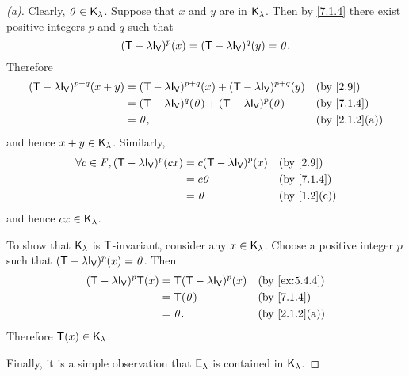 \begin{proof}[(a)]
  Clearly, \(\mathit{0} \in \mathsf{K}_{\lambda}\).
  Suppose that \(x\) and \(y\) are in \(\mathsf{K}_{\lambda}\).
  Then by \cref{7.1.4} there exist positive integers \(p\) and \(q\) such that
  \[
    (\T - \lambda \IT[\V])^p(x) = (\T - \lambda \IT[\V])^q(y) = \zv.
  \]
  Therefore
  \begin{align*}
    (\T - \lambda \IT[\V])^{p + q}(x + y) & = (\T - \lambda \IT[\V])^{p + q}(x) + (\T - \lambda \IT[\V])^{p + q}(y) &  & \by{2.9}      \\
                                          & = (\T - \lambda \IT[\V])^q(\zv) + (\T - \lambda \IT[\V])^p(\zv)         &  & \by{7.1.4}    \\
                                          & = \zv,                                                                  &  & \by{2.1.2}[a]
  \end{align*}
  and hence \(x + y \in \mathsf{K}_{\lambda}\).
  Similarly,
  \begin{align*}
    \forall c \in \F, (\T - \lambda \IT[\V])^p(cx) & = c (\T - \lambda \IT[\V])^p(x) &  & \by{2.9}    \\
                                                   & = c \zv                         &  & \by{7.1.4}  \\
                                                   & = \zv                           &  & \by{1.2}[c]
  \end{align*}
  and hence \(cx \in \mathsf{K}_{\lambda}\).

  To show that \(\mathsf{K}_{\lambda}\) is \(\mathsf{T}\)-invariant, consider any \(x \in \mathsf{K}_{\lambda}\).
  Choose a positive integer \(p\) such that \((\T - \lambda \IT[\V])^p(x) = \zv\).
  Then
  \begin{align*}
    (\T - \lambda \IT[\V])^p \T(x) & = \T (\T - \lambda \IT[\V])^p(x) &  & \by{ex:5.4.4} \\
                                   & = \T(\zv)                        &  & \by{7.1.4}    \\
                                   & = \zv.                           &  & \by{2.1.2}[a]
  \end{align*}
  Therefore \(\mathsf{T}(x) \in \mathsf{K}_{\lambda}\).

  Finally, it is a simple observation that \(\mathsf{E}_{\lambda}\) is contained in \(\mathsf{K}_{\lambda}\).
\end{proof}

